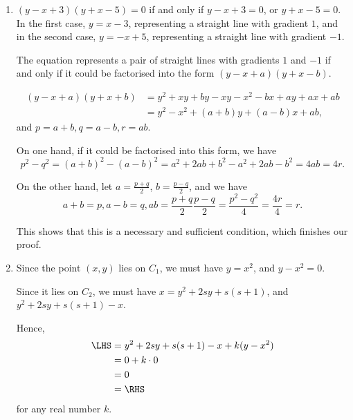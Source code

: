 \Question{\currfilebase}

\begin{enumerate}
    \item \((y - x + 3) (y + x - 5) = 0\) if and only if \(y - x + 3 = 0\), or \(y + x - 5 = 0\). In the first case, \(y = x - 3\), representing a straight line with gradient \(1\), and in the second case, \(y = -x + 5\), representing a straight line with gradient \(-1\).

          The equation represents a pair of straight lines with gradients \(1\) and \(-1\) if and only if it could be factorised into the form \((y - x + a) (y + x - b)\).

          \begin{align*}
              (y - x + a) (y + x + b) & = y^2 + xy + by - xy - x^2 - bx + ay + ax + ab \\
                                      & = y^2 - x^2 + (a + b) y + (a - b) x + ab,
          \end{align*}
          and \(p = a + b, q = a - b, r = ab\).

          On one hand, if it could be factorised into this form, we have
          \[
              p^2 - q^2 = (a + b)^2 - (a - b)^2 = a^2 + 2ab + b^2 - a^2 + 2ab - b^2 = 4ab = 4r.
          \]

          On the other hand, let \(a = \frac{p + q}{2}\), \(b = \frac{p - q}{2}\), and we have
          \[
              a + b = p, a - b = q, ab = \frac{p + q}{2} \frac{p - q}{2} = \frac{p^2 - q^2}{4} = \frac{4r}{4} = r.
          \]

          This shows that this is a necessary and sufficient condition, which finishes our proof.

    \item Since the point \((x, y)\) lies on \(C_1\), we must have \(y = x^2\), and \(y - x^2 = 0\).

          Since it lies on \(C_2\), we must have \(x = y^2 + 2sy + s (s + 1)\), and \(y^2 + 2sy + s (s + 1) - x\).

          Hence,
          \begin{align*}
              \LHS & = y^2 + 2sy + s (s + 1) - x + k (y - x^2) \\
                   & = 0 + k \cdot 0                           \\
                   & = 0                                       \\
                   & = \RHS
          \end{align*}
          for any real number \(k\).


\end{enumerate}
